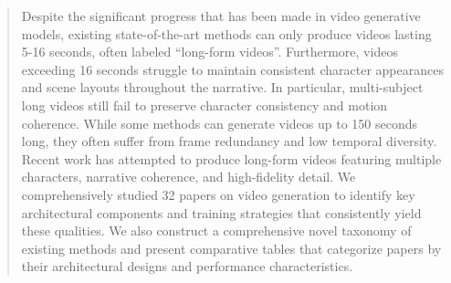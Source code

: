 \begin{abstract}
 Despite the significant progress that has been made in video generative models, existing state-of-the-art methods can only produce videos lasting 5-16 seconds, often labeled “long-form videos”. Furthermore, videos exceeding 16 seconds struggle to maintain consistent character appearances and scene layouts throughout the narrative. In particular, multi-subject long videos still fail to preserve character consistency and motion coherence. While some methods can generate videos up to 150 seconds long, they often suffer from frame redundancy and low temporal diversity. Recent work has attempted to produce long-form videos featuring multiple characters, narrative coherence, and high-fidelity detail. We comprehensively studied 32 papers on video generation to identify key architectural components and training strategies that consistently yield these qualities. We also construct a comprehensive novel taxonomy of existing methods and present comparative tables that categorize papers by their architectural designs and performance characteristics.
\end{abstract}
